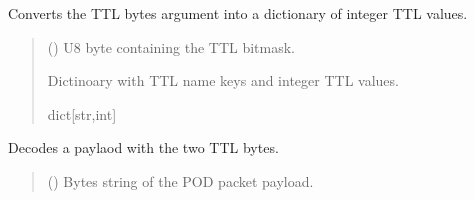 \documentclass[letterpaper,10pt,english]{sphinxmanual}
\begin{document}
\begin{fulllineitems}
\begin{fulllineitems}
\begin{quote}
\begin{description}
\end{description}\end{quote}

\end{fulllineitems}


\begin{fulllineitems}
\label{\detokenize{PodApi.Devices:PodApi.Devices.PodDevice_8401HR.Pod8401HR.DecodeTTLByte}}
\pysigstartsignatures
{}
\pysigstopsignatures
\sphinxAtStartPar
Converts the TTL bytes argument into a dictionary of integer TTL values.
\begin{quote}\begin{description}
\sphinxAtStartPar
{} () \textendash{} U8 byte containing the TTL bitmask.

\sphinxAtStartPar
Dictinoary with TTL name keys and integer TTL values.

\sphinxAtStartPar
dict{[}str,int{]}

\end{description}\end{quote}

\end{fulllineitems}


\begin{fulllineitems}
\label{\detokenize{PodApi.Devices:PodApi.Devices.PodDevice_8401HR.Pod8401HR.DecodeTTLPayload}}
\pysigstartsignatures
{}
\pysigstopsignatures
\sphinxAtStartPar
Decodes a paylaod with the two TTL bytes.
\begin{quote}\begin{description}
\sphinxAtStartPar
{} () \textendash{} Bytes string of the POD packet payload.


\end{description}
\end{quote}
\end{fulllineitems}
\end{fulllineitems}
\end{document}
